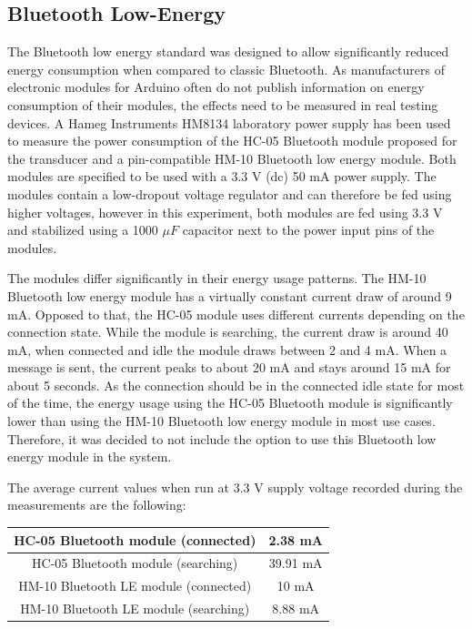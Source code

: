 \subsection{Bluetooth Low-Energy}
The Bluetooth low energy standard was designed to allow significantly reduced energy consumption when compared to classic Bluetooth. As manufacturers of electronic modules for Arduino often do not publish information on energy consumption of their modules, the effects need to be measured in real testing devices. A Hameg Instruments HM8134 laboratory power supply has been used to measure the power consumption of the HC-05 Bluetooth module proposed for the transducer and a pin-compatible HM-10 Bluetooth low energy module. Both modules are specified to be used with a 3.3 V (dc) 50 mA power supply. The modules contain a low-dropout voltage regulator and can therefore be fed using higher voltages, however in this experiment, both modules are fed using 3.3 V and stabilized using a 1000 $\mu F$ capacitor next to the power input pins of the modules.

The modules differ significantly in their energy usage patterns. The HM-10 Bluetooth low energy module has a virtually constant current draw of around 9 mA. Opposed to that, the HC-05 module uses different currents depending on the connection state. While the module is searching, the current draw is around 40 mA, when connected and idle the module draws between 2 and 4 mA. When a message is sent, the current peaks to about 20 mA and stays around 15 mA for about 5 seconds. As the connection should be in the connected idle state for most of the time, the energy usage using the HC-05 Bluetooth module is significantly lower than using the HM-10 Bluetooth low energy module in most use cases. Therefore, it was decided to not include the option to use this Bluetooth low energy module in the system.

The average current values when run at 3.3 V supply voltage recorded during the measurements are the following:
\begin{center}
  \begin{tabular}{ | c | c |}
    \hline
	\hline
    HC-05 Bluetooth module (connected) & 2.38 mA \\ \hline
    HC-05 Bluetooth module (searching) & 39.91 mA \\ \hline
    HM-10 Bluetooth LE module (connected) & 10 mA \\ \hline
    HM-10 Bluetooth LE module (searching) & 8.88 mA \\ \hline
    \hline
  \end{tabular}
\end{center}

